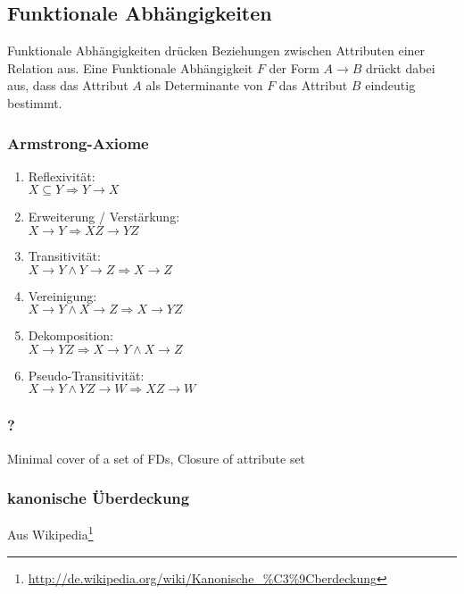 %
%
\subsection{Funktionale Abhängigkeiten}

Funktionale Abhängigkeiten drücken Beziehungen zwischen Attributen einer Relation aus.
Eine Funktionale Abhängigkeit $F$ der Form $A \rightarrow B$ drückt dabei aus, dass das Attribut $A$ als Determinante von $F$ das Attribut $B$ eindeutig bestimmt.

\subsubsection{Armstrong-Axiome}

\begin{enumerate}
\item Reflexivität:\\ $X \subseteq Y \Rightarrow Y \rightarrow X$
\item Erweiterung / Verstärkung:\\ $X \rightarrow Y \Rightarrow XZ \rightarrow YZ$
\item Transitivität:\\ $X \rightarrow Y \land Y \rightarrow Z \Rightarrow X \rightarrow Z$
\item Vereinigung:\\ $X \rightarrow Y \land X \rightarrow Z \Rightarrow X \rightarrow YZ$
\item Dekomposition:\\ $X \rightarrow YZ \Rightarrow X \rightarrow Y \land X \rightarrow Z$
\item Pseudo-Transitivität:\\ $X \rightarrow Y \land YZ \rightarrow W \Rightarrow XZ \rightarrow W$
\end{enumerate}

\subsubsection{?}

Minimal cover of a set of FDs, Closure of attribute set

\subsubsection{kanonische Überdeckung}

Aus Wikipedia\footnote{\url{http://de.wikipedia.org/wiki/Kanonische_\%C3\%9Cberdeckung}}

